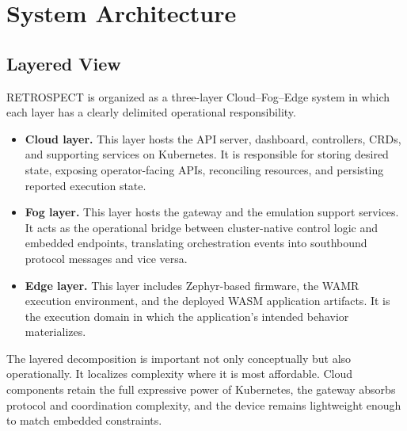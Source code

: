 \section{System Architecture}

\subsection{Layered View}
RETROSPECT is organized as a three-layer Cloud--Fog--Edge system in which each layer has a clearly delimited operational responsibility.
\begin{itemize}
    \item \textbf{Cloud layer.} This layer hosts the API server, dashboard, controllers, CRDs, and supporting services on Kubernetes. It is responsible for storing desired state, exposing operator-facing APIs, reconciling resources, and persisting reported execution state.
    \item \textbf{Fog layer.} This layer hosts the gateway and the emulation support services. It acts as the operational bridge between cluster-native control logic and embedded endpoints, translating orchestration events into southbound protocol messages and vice versa.
    \item \textbf{Edge layer.} This layer includes Zephyr-based firmware, the WAMR execution environment, and the deployed WASM application artifacts. It is the execution domain in which the application's intended behavior materializes.
\end{itemize}

The layered decomposition is important not only conceptually but also operationally. It localizes complexity where it is most affordable. Cloud components retain the full expressive power of Kubernetes, the gateway absorbs protocol and coordination complexity, and the device remains lightweight enough to match embedded constraints.

